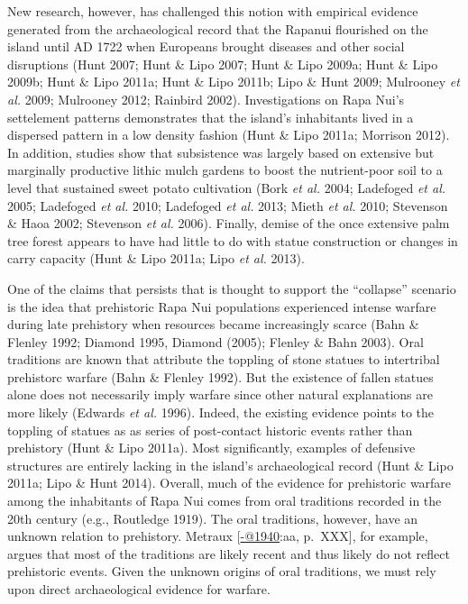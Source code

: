 \documentclass[]{article}
\begin{document}
New research, however, has challenged this notion with empirical
evidence generated from the archaeological record that the Rapanui
flourished on the island until AD 1722 when Europeans brought diseases
and other social disruptions (Hunt 2007; Hunt \& Lipo 2007; Hunt \& Lipo
2009a; Hunt \& Lipo 2009b; Hunt \& Lipo 2011a; Hunt \& Lipo 2011b; Lipo
\& Hunt 2009; Mulrooney \emph{et al.} 2009; Mulrooney 2012; Rainbird
2002). Investigations on Rapa Nui's settelement patterns demonstrates
that the island's inhabitants lived in a dispersed pattern in a low
density fashion (Hunt \& Lipo 2011a; Morrison 2012). In addition,
studies show that subsistence was largely based on extensive but
marginally productive lithic mulch gardens to boost the nutrient-poor
soil to a level that sustained sweet potato cultivation (Bork \emph{et
al.} 2004; Ladefoged \emph{et al.} 2005; Ladefoged \emph{et al.} 2010;
Ladefoged \emph{et al.} 2013; Mieth \emph{et al.} 2010; Stevenson \&
Haoa 2002; Stevenson \emph{et al.} 2006). Finally, demise of the once
extensive palm tree forest appears to have had little to do with statue
construction or changes in carry capacity (Hunt \& Lipo 2011a; Lipo
\emph{et al.} 2013).

One of the claims that persists that is thought to support the
``collapse'' scenario is the idea that prehistoric Rapa Nui populations
experienced intense warfare during late prehistory when resources became
increasingly scarce (Bahn \& Flenley 1992; Diamond 1995, Diamond (2005);
Flenley \& Bahn 2003). Oral traditions are known that attribute the
toppling of stone statues to intertribal prehistorc warfare (Bahn \&
Flenley 1992). But the existence of fallen statues alone does not
necessarily imply warfare since other natural explanations are more
likely (Edwards \emph{et al.} 1996). Indeed, the existing evidence
points to the toppling of statues as as series of post-contact historic
events rather than prehistory (Hunt \& Lipo 2011a). Most significantly,
examples of defensive structures are entirely lacking in the island's
archaeological record (Hunt \& Lipo 2011a; Lipo \& Hunt 2014). Overall,
much of the evidence for prehistoric warfare among the inhabitants of
Rapa Nui comes from oral traditions recorded in the 20th century (e.g.,
Routledge 1919). The oral traditions, however, have an unknown relation
to prehistory. Metraux {[}\href{mailto:-@1940}{-@1940}:aa, p.~XXX{]},
for example, argues that most of the traditions are likely recent and
thus likely do not reflect prehistoric events. Given the unknown origins
of oral traditions, we must rely upon direct archaeological evidence for
warfare.
\end{document}
